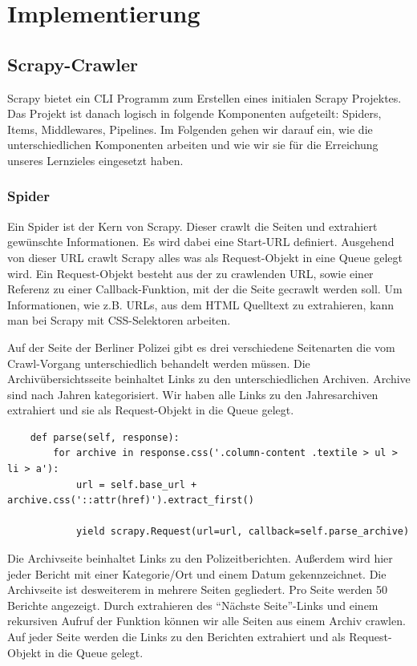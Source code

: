 \documentclass[chapterprefix=false, 12pt, a4paper, oneside, parskip=half, listof=totoc, bibliography=totoc, numbers=noendperiod]{scrbook}
\begin{document}
	\chapter{Implementierung}

    \section{Scrapy-Crawler}

    Scrapy bietet ein CLI Programm zum Erstellen eines initialen Scrapy Projektes.
    Das Projekt ist danach logisch in folgende Komponenten aufgeteilt: Spiders, Items, Middlewares, Pipelines.
    Im Folgenden gehen wir darauf ein, wie die unterschiedlichen Komponenten arbeiten und wie wir sie für die
    Erreichung unseres Lernzieles eingesetzt haben.

    \subsection{Spider}

    Ein Spider ist der Kern von Scrapy. Dieser crawlt die Seiten und extrahiert gewünschte Informationen.
    Es wird dabei eine Start-URL definiert. Ausgehend von dieser URL crawlt Scrapy alles was als Request-Objekt in
    eine Queue gelegt wird. Ein Request-Objekt besteht aus der zu crawlenden URL, sowie einer Referenz zu einer Callback-Funktion,
    mit der die Seite gecrawlt werden soll. Um Informationen, wie z.B. URLs, aus dem HTML Quelltext zu extrahieren, kann man bei Scrapy
    mit CSS-Selektoren arbeiten.

    Auf der Seite der Berliner Polizei gibt es drei verschiedene Seitenarten die vom Crawl-Vorgang
    unterschiedlich behandelt werden müssen. Die Archivübersichtsseite beinhaltet Links zu den unterschiedlichen Archiven.
    Archive sind nach Jahren kategorisiert. Wir haben alle Links zu den Jahresarchiven extrahiert und sie als Request-Objekt in die Queue gelegt.

    \begin{verbatim}
    def parse(self, response):
        for archive in response.css('.column-content .textile > ul > li > a'):
            url = self.base_url + archive.css('::attr(href)').extract_first()

            yield scrapy.Request(url=url, callback=self.parse_archive)
    \end{verbatim}

    Die Archivseite beinhaltet Links zu den Polizeitberichten. Außerdem wird hier jeder Bericht mit einer Kategorie/Ort
    und einem Datum gekennzeichnet. Die Archivseite ist desweiterem in mehrere Seiten gegliedert. Pro Seite werden 50 Berichte angezeigt.
    Durch extrahieren des "`Nächste Seite"'-Links und einem rekursiven Aufruf der Funktion können wir alle Seiten aus einem
    Archiv crawlen. Auf jeder Seite werden die Links zu den Berichten extrahiert und als Request-Objekt in die Queue gelegt.
\end{document}
